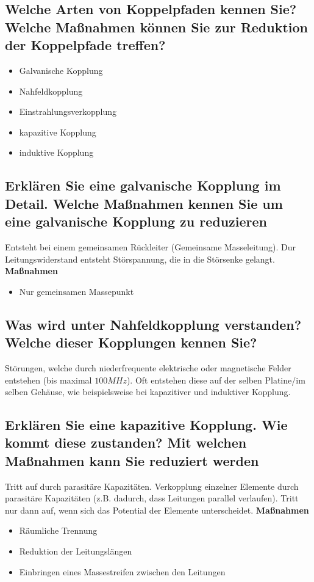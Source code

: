 \subsection{Welche Arten von Koppelpfaden kennen Sie? Welche Maßnahmen können Sie zur Reduktion der Koppelpfade treffen?}
\begin{itemize}
  \item Galvanische Kopplung
  \item Nahfeldkopplung
  \item Einstrahlungsverkopplung
  \item kapazitive Kopplung
  \item induktive Kopplung
\end{itemize}

\subsection{Erklären Sie eine galvanische Kopplung im Detail. Welche Maßnahmen kennen Sie um eine galvanische Kopplung zu reduzieren}
Entsteht bei einem gemeinsamen Rückleiter (Gemeinsame Masseleitung). Dur Leitungswiderstand entsteht Störspannung, die in die Störsenke gelangt.\p
\textbf{Maßnahmen}
\begin{itemize}
  \item Nur gemeinsamen Massepunkt
\end{itemize}


\subsection{Was wird unter Nahfeldkopplung verstanden? Welche dieser Kopplungen kennen Sie?}
Störungen, welche durch niederfrequente elektrische oder magnetische Felder entstehen (bis maximal \(100MHz\)). Oft entstehen diese auf der selben Platine/im selben Gehäuse, wie beispielsweise bei kapazitiver und induktiver Kopplung.


\subsection{Erklären Sie eine kapazitive Kopplung. Wie kommt diese zustanden? Mit welchen Maßnahmen kann Sie reduziert werden}
Tritt auf durch parasitäre Kapazitäten. Verkopplung einzelner Elemente durch parasitäre Kapazitäten (z.B. dadurch, dass Leitungen parallel verlaufen). Tritt nur dann auf, wenn sich das Potential der Elemente unterscheidet.\p
\textbf{Maßnahmen}
\begin{itemize}
  \item Räumliche Trennung
  \item Reduktion der Leitungslängen
  \item Einbringen eines Massestreifen zwischen den Leitungen
\end{itemize}

